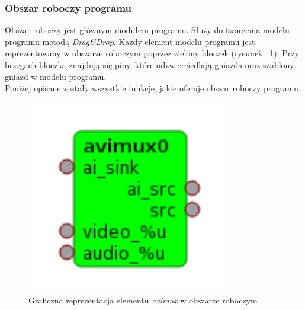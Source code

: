 \documentclass[12pt]{article}
\begin{document}
\subsubsection{Obszar roboczy programu}
\begin{minipage}{0.65\textwidth}
Obszar roboczy jest głównym modułem programu. Służy do tworzenia modelu programu metodą \textit{Drag\&Drop}. Każdy element modelu programu jest reprezentowany w obszarze roboczym poprzez zielony bloczek (rysunek ~\ref{fig:sampleBlock}). Przy brzegach bloczka znajdują się piny, które odzwierciedlają gniazda oraz szablony gniazd w modelu programu. \\
Poniżej opisane zostały wszystkie funkcje, jakie oferuje obszar roboczy programu.
\end{minipage}
\hfill
\begin{minipage}{0.3\textwidth}\raggedleft
\begin{figure}[H]
  \includegraphics[width=0.8\textwidth]{img/sample-block.png}
  \caption{Graficzna reprezentacja elementu \textit{avimux} w obszarze roboczym}
  \label{fig:sampleBlock}
\end{figure}
\end{minipage}
\end{document}
